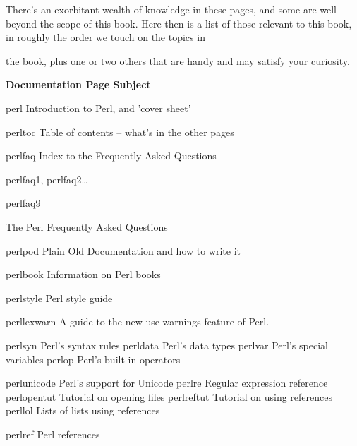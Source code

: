 \documentclass[a4paper,11pt]{book}
\begin{document}
\noindent 

\noindent There's an exorbitant wealth of knowledge in these pages, and some are well beyond the scope of this book. Here then is a list of those relevant to this book, in roughly the order we touch on the topics in

\noindent the book, plus one or two others that are handy and may satisfy your curiosity.

\noindent 

\noindent 

\noindent \textbf{Documentation Page Subject}

\noindent 

\noindent perl Introduction to Perl, and 'cover sheet'

\noindent 

\noindent perltoc Table of contents -- what's in the other pages

\noindent 

\noindent perlfaq Index to the Frequently Asked Questions

\noindent 

\noindent perlfaq1, perlfaq2\dots 

\noindent perlfaq9

\noindent 

\noindent The Perl Frequently Asked Questions

\noindent 

\noindent perlpod Plain Old Documentation and how to write it

\noindent 

\noindent perlbook Information on Perl books

\noindent 

\noindent perlstyle Perl style guide

\noindent 

\noindent perllexwarn A guide to the new use warnings feature of Perl.

\noindent 

\noindent perlsyn Perl's syntax rules perldata Perl's data types perlvar Perl's special variables perlop Perl's built-in operators

\noindent perlunicode Perl's support for Unicode perlre Regular expression reference perlopentut Tutorial on opening files perlreftut Tutorial on using references perllol Lists of lists using references

\noindent perlref Perl references

\noindent 

\noindent 
\end{document}
